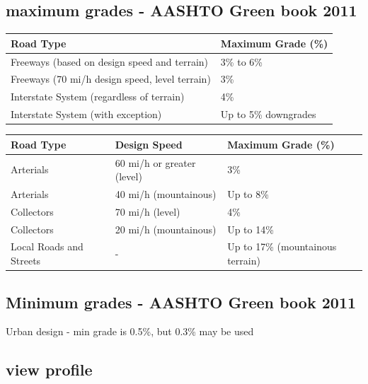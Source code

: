 \documentclass{article}   %
\begin{document}
  \subsection{maximum grades - AASHTO Green book 2011}

  \vspace{1cm} %
  \begin{center}
  \begin{tabular}{l l}
    \textbf{Road Type} & \textbf{Maximum Grade (\%)} \\
    \hline
    Freeways (based on design speed and terrain) & 3\% to 6\% \\
    Freeways (70 mi/h design speed, level terrain) & 3\% \\
    Interstate System (regardless of terrain) & 4\% \\
    Interstate System (with exception) & Up to 5\% downgrades \\
  \end{tabular}
  \end{center}

  \vspace{1cm} %
  \begin{center}
  \begin{tabular}{l l l}
    \textbf{Road Type} & \textbf{Design Speed} & \textbf{Maximum Grade (\%)} \\
    \hline
    Arterials & 60 mi/h or greater (level) & 3\% \\
    Arterials & 40 mi/h (mountainous) & Up to 8\% \\
    Collectors & 70 mi/h (level) & 4\% \\
    Collectors & 20 mi/h (mountainous) & Up to 14\% \\
    Local Roads and Streets & - & Up to 17\% (mountainous terrain) \\
  \end{tabular}
  \end{center}

  \subsection{Minimum grades - AASHTO Green book 2011}
  Urban design - min grade is 0.5\%, but 0.3\% may be used

  \newpage
  \subsection{view profile}
\end{document}
